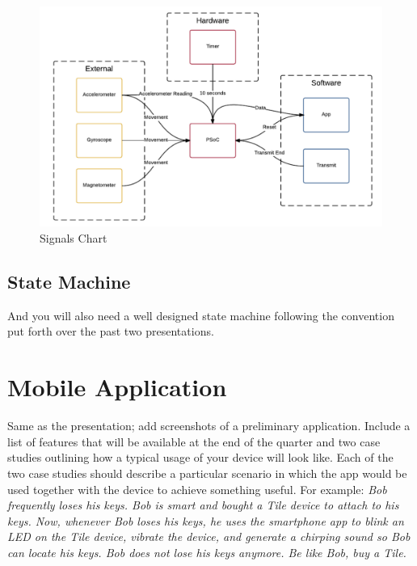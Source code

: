 \documentclass{sig-alternate-ipsn13}
\begin{document}
\begin{figure}
  \centering 
	\includegraphics[width=\columnwidth]{images/signals.png}
    \caption{Signals Chart}
    \label{fig:Signals}
\end{figure}

\subsection{State Machine}

And you will also need a well designed state machine following the convention put forth over the past two presentations. 


\section{Mobile Application} 

Same as the presentation; add screenshots of a preliminary application. Include a list of features that will be available at the end of the quarter and two case studies outlining how a typical usage of your device will look like. Each of the two case studies should describe a particular scenario in which the app would be used together with the device to achieve something useful. For example:  \textit{Bob frequently loses his keys. Bob is smart and bought a Tile device to attach to his keys. Now, whenever Bob loses his keys, he uses the smartphone app to blink an LED on the Tile device, vibrate the device, and generate a chirping sound so Bob can locate his keys. Bob does not lose his keys anymore. Be like Bob, buy a Tile.}
\end{document}
